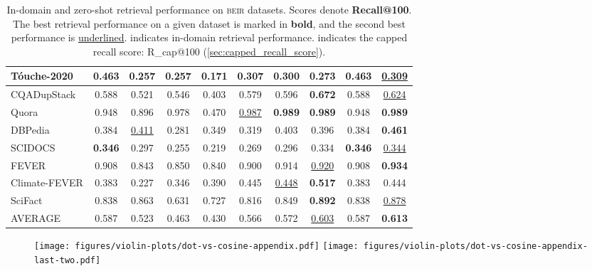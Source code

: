 \documentclass[11pt]{article}
\newcommand{\custo}[1]{\textsc{\normalsize #1}}
\newcommand{\beir}{\custo{beir}\xspace}
\begin{document}
\begin{table*}[t!]
{\begin{tabular}{l | c | c | c c c c c | c c}
   T\'ouche-2020 & \textbf{0.463} & 0.257 & 0.257 & 0.171 & 0.307 & 0.300 & 0.273 & \textbf{0.463} & \underline{0.309} \\ \midrule 
   CQADupStack   & 0.588 & 0.521 & 0.546 & 0.403 & 0.579 & 0.596 & \textbf{0.672} & 0.588 & \underline{0.624} \\
   Quora         & 0.948 & 0.896 & 0.978 & 0.470 & \underline{0.987} & \textbf{0.989} & \textbf{0.989} & 0.948 & \textbf{0.989} \\ \midrule
   DBPedia       & 0.384 & \underline{0.411} & 0.281 & 0.349 & 0.319 & 0.403 & 0.396 & 0.384 & \textbf{0.461} \\ \midrule
   SCIDOCS       & \textbf{0.346} & 0.297 & 0.255 & 0.219 & 0.269 & 0.296 & 0.334 & \textbf{0.346} & \underline{0.344} \\ \midrule
   FEVER         & 0.908 & 0.843 & 0.850 & 0.840 & 0.900 & 0.914 & \underline{0.920} & 0.908 & \textbf{0.934} \\ 
   Climate-FEVER & 0.383 & 0.227 & 0.346 & 0.390 & 0.445 & \underline{0.448} & \textbf{0.517} & 0.383 & 0.444 \\ 
   SciFact       & 0.838 & 0.863 & 0.631 & 0.727 & 0.816 & 0.849 & \textbf{0.892} & 0.838 & \underline{0.878} \\ \midrule
   AVERAGE       & 0.587 & 0.523 & 0.463  & 0.430 & 0.566 & 0.572 & \underline{0.603} & 0.587 & \textbf{0.613} \\ 
        \bottomrule
    \end{tabular}}
    \caption{In-domain and zero-shot retrieval performance on \beir datasets. Scores denote \textbf{Recall@100}. The best retrieval performance on a given dataset is marked in \textbf{bold}, and the second best performance is \underline{underlined}.  indicates in-domain retrieval performance.  indicates the capped recall score: R\_cap@100 (\autoref{sec:capped_recall_score}). }
    \label{tab:results-recall}
\end{table*}



\begin{figure*}[t]
    \centering
    \begin{center}
        \texttt{[image: figures/violin-plots/dot-vs-cosine-appendix.pdf]}
        \texttt{[image: figures/violin-plots/dot-vs-cosine-appendix-last-two.pdf]}
        \label{fig:violin-plots-all}
    \end{center}
    \vspace{-2mm}
\end{figure*}
\end{document}
